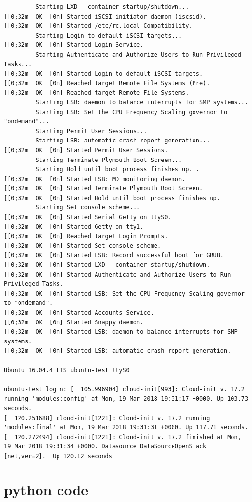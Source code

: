 \documentclass[12pt]{article}
\begin{document}
\begin{verbatim}
         Starting LXD - container startup/shutdown...
[[0;32m  OK  [0m] Started iSCSI initiator daemon (iscsid).
[[0;32m  OK  [0m] Started /etc/rc.local Compatibility.
         Starting Login to default iSCSI targets...
[[0;32m  OK  [0m] Started Login Service.
         Starting Authenticate and Authorize Users to Run Privileged Tasks...
[[0;32m  OK  [0m] Started Login to default iSCSI targets.
[[0;32m  OK  [0m] Reached target Remote File Systems (Pre).
[[0;32m  OK  [0m] Reached target Remote File Systems.
         Starting LSB: daemon to balance interrupts for SMP systems...
         Starting LSB: Set the CPU Frequency Scaling governor to "ondemand"...
         Starting Permit User Sessions...
         Starting LSB: automatic crash report generation...
[[0;32m  OK  [0m] Started Permit User Sessions.
         Starting Terminate Plymouth Boot Screen...
         Starting Hold until boot process finishes up...
[[0;32m  OK  [0m] Started LSB: MD monitoring daemon.
[[0;32m  OK  [0m] Started Terminate Plymouth Boot Screen.
[[0;32m  OK  [0m] Started Hold until boot process finishes up.
         Starting Set console scheme...
[[0;32m  OK  [0m] Started Serial Getty on ttyS0.
[[0;32m  OK  [0m] Started Getty on tty1.
[[0;32m  OK  [0m] Reached target Login Prompts.
[[0;32m  OK  [0m] Started Set console scheme.
[[0;32m  OK  [0m] Started LSB: Record successful boot for GRUB.
[[0;32m  OK  [0m] Started LXD - container startup/shutdown.
[[0;32m  OK  [0m] Started Authenticate and Authorize Users to Run Privileged Tasks.
[[0;32m  OK  [0m] Started LSB: Set the CPU Frequency Scaling governor to "ondemand".
[[0;32m  OK  [0m] Started Accounts Service.
[[0;32m  OK  [0m] Started Snappy daemon.
[[0;32m  OK  [0m] Started LSB: daemon to balance interrupts for SMP systems.
[[0;32m  OK  [0m] Started LSB: automatic crash report generation.

Ubuntu 16.04.4 LTS ubuntu-test ttyS0

ubuntu-test login: [  105.996904] cloud-init[993]: Cloud-init v. 17.2 running 'modules:config' at Mon, 19 Mar 2018 19:31:17 +0000. Up 103.73 seconds.
[  120.251688] cloud-init[1221]: Cloud-init v. 17.2 running 'modules:final' at Mon, 19 Mar 2018 19:31:31 +0000. Up 117.71 seconds.
[  120.272494] cloud-init[1221]: Cloud-init v. 17.2 finished at Mon, 19 Mar 2018 19:31:34 +0000. Datasource DataSourceOpenStack [net,ver=2].  Up 120.12 seconds
\end{verbatim}

\newpage
\clearpage
\section{python code}
\end{document}
